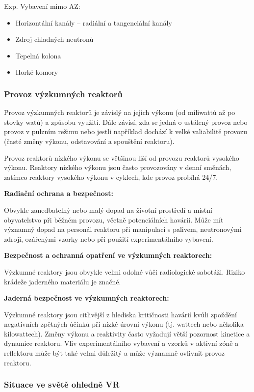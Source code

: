 Exp. Vybavení mimo AZ:

\begin{itemize}
    \item Horizontální kanály -- radiální a tangenciální kanály
    \item Zdroj chladných neutronů
    \item Tepelná kolona
    \item Horké komory
\end{itemize}

\subsubsection*{Provoz výzkumných reaktorů}

Provoz výzkumných reaktorů je závislý na jejich výkonu (od miliwattů až po stovky watů) a způsobu využití. Dále závisí, zda se jedná o ustálený provoz nebo provoz v pulzním režimu nebo jestli například dochází k velké valiabilitě provozu (časté změny výkonu, odstavování a spouštění reaktoru). 

Provoz reaktorů nízkého výkonu se většinou liší od provozu reaktorů vysokého výkonu. Reaktory nízkého výkonu jsou často provozovány v denní směnách, zatímco reaktory vysokého výkonu v cyklech, kde provoz probíhá 24/7.

\textbf{Radiační ochrana a bezpečnost:}

Obvykle zanedbatelný nebo malý dopad na životní prostředí a místní obyvatelstvo při běžném provozu, včetně potenciálních havárií. Může mít významný dopad na personál reaktoru při manipulaci s palivem, neutronovými zdroji, ozářenými vzorky nebo při použití experimentálního vybavení.

\textbf{Bezpečnost a ochranná opatření ve výzkumných reaktorech:}

Výzkumné reaktory jsou obvykle velmi odolné vůči radiologické sabotáži. Riziko krádeže jaderného materiálu je značné.
 
\textbf{Jaderná bezpečnost ve výzkumných reaktorech:}

Výzkumné reaktory jsou citlivější z hlediska kritičnosti havárií kvůli zpoždění negativních zpětných účinků při nízké úrovni výkonu (tj. wattech nebo několika kilowattech). Změny výkonu a reaktivity často vyžadují větší pozornost kinetice a dynamice reaktoru. Vliv experimentálního vybavení a vzorků v aktivní zóně a reflektoru může být také velmi důležitý a může významně ovlivnit provoz reaktoru. 

\subsubsection{Situace ve světě ohledně VR}

